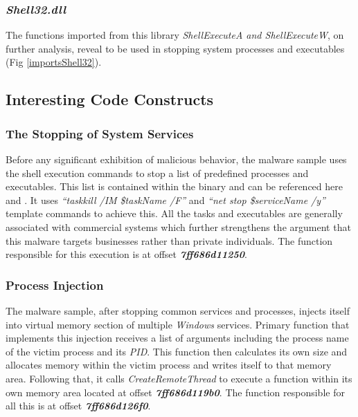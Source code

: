 \documentclass[10pt,a4paper]{article}
\begin{document}
		\subsubsection*{\textit{Shell32.dll}}
		\vspace{-1em}
		The functions imported from this library \textit{ShellExecuteA and ShellExecuteW}, on further analysis, reveal to be used in stopping system processes and executables (Fig \ref{importsShell32}).

	\subsection{Interesting Code Constructs}
		\subsubsection*{The Stopping of System Services}
		\vspace{-1em}
		Before any significant exhibition of malicious behavior, the malware sample uses the shell execution commands to stop a list of predefined processes and executables.
		This list is contained within the binary and can be referenced here \cite{stoppedServices} and \cite{stoppedProcesses}.
		It uses \textit{``taskkill /IM \${taskName} /F''} and \textit{``net stop \${serviceName} /y''} template commands to achieve this.
		All the tasks and executables are generally associated with commercial systems which further strengthens the argument that this malware targets businesses rather than private individuals.
		The function responsible for this execution is at offset \textit{\textbf{7ff686d11250}}.

		\subsubsection*{Process Injection}
		\vspace{-1em}
		The malware sample, after stopping common services and processes, injects itself into virtual memory section of multiple \textit{Windows} services.
		Primary function that implements this injection receives a list of arguments including the process name of the victim process and its \textit{PID}.
		This function then calculates its own size and allocates memory within the victim process and writes itself to that memory area.
		Following that, it calls \textit{CreateRemoteThread} to execute a function within its own memory area located at offset \textit{\textbf{7ff686d119b0}}.
		The function responsible for all this is at offset \textit{\textbf{7ff686d126f0}}.
\end{document}
